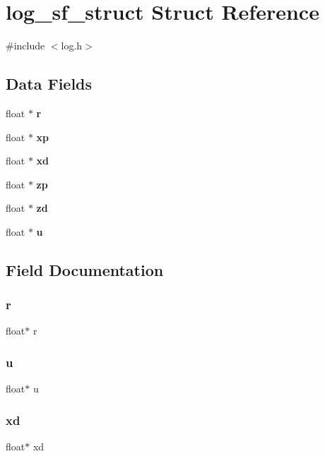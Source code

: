 \section{log\+\_\+sf\+\_\+struct Struct Reference}
\label{structlog__sf__struct}


{\ttfamily \#include $<$log.\+h$>$}

\subsection*{Data Fields}
\begin{DoxyCompactItemize}
\item 
float $\ast$ \textbf{ r}
\item 
float $\ast$ \textbf{ xp}
\item 
float $\ast$ \textbf{ xd}
\item 
float $\ast$ \textbf{ zp}
\item 
float $\ast$ \textbf{ zd}
\item 
float $\ast$ \textbf{ u}
\end{DoxyCompactItemize}


\subsection{Field Documentation}
\mbox{\label{structlog__sf__struct_a47552d5cf47e6583c56f4d43d2b55ae3}} 
\subsubsection{r}
{\footnotesize\ttfamily float$\ast$ r}

\mbox{\label{structlog__sf__struct_a3bbaebe865e942a734071e053e3fc020}} 
\subsubsection{u}
{\footnotesize\ttfamily float$\ast$ u}

\mbox{\label{structlog__sf__struct_a60c79178fc46e736294cd0a4406384a1}} 
\subsubsection{xd}
{\footnotesize\ttfamily float$\ast$ xd}

